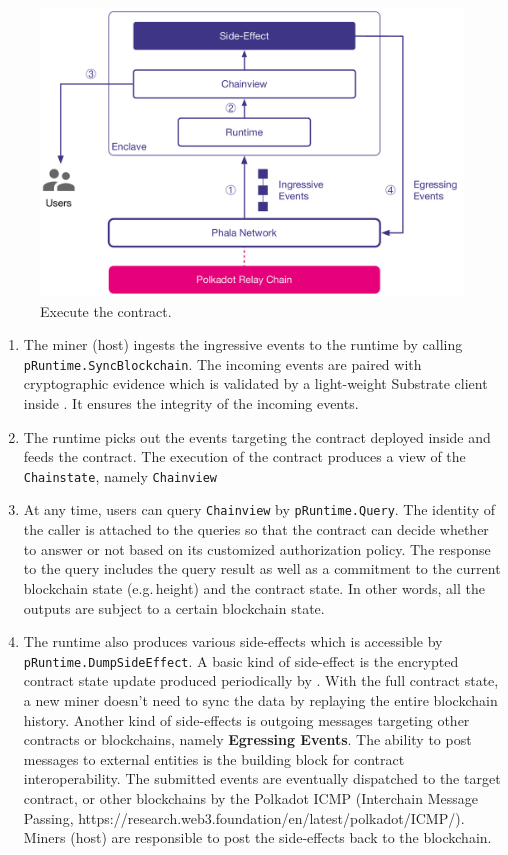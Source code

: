 \begin{figure}
    \centering \footnotesize
    \includegraphics[width=.7\columnwidth]{img/pLIBRA-execute}
    \caption{Execute the contract.}
    \label{fig:contract-execution}
\end{figure}

\begin{enumerate}
    \item The miner (host) ingests the ingressive events to the runtime by calling \texttt{pRuntime.SyncBlockchain}. The incoming events are paired with cryptographic evidence which is validated by a light-weight Substrate client inside \pruntime. It ensures the integrity of the incoming events.
    \item The runtime picks out the events targeting the contract deployed inside and feeds the contract. The execution of the contract produces a view of the \texttt{Chainstate}, namely \texttt{Chainview}
    \item At any time, users can query \texttt{Chainview} by \texttt{pRuntime.Query}. The identity of the caller is attached to the queries so that the contract can decide whether to answer or not based on its customized authorization policy. The response to the query includes the query result as well as a commitment to the current blockchain state (e.g.\,height) and the contract state. In other words, all the outputs are subject to a certain blockchain state.
    \item The runtime also produces various side-effects which is accessible by \texttt{pRuntime.DumpSideEffect}. A basic kind of side-effect is the encrypted contract state update produced periodically by \pruntime. With the full contract state, a new miner doesn't need to sync the data by replaying the entire blockchain history. Another kind of side-effects is outgoing messages targeting other contracts or blockchains, namely \textbf{Egressing Events}. The ability to post messages to external entities is the building block for contract interoperability. The submitted events are eventually dispatched to the target contract, or other blockchains by the Polkadot ICMP (Interchain Message Passing, https://research.web3.foundation/en/latest/polkadot/ICMP/). Miners (host) are responsible to post the side-effects back to the blockchain.
\end{enumerate}

